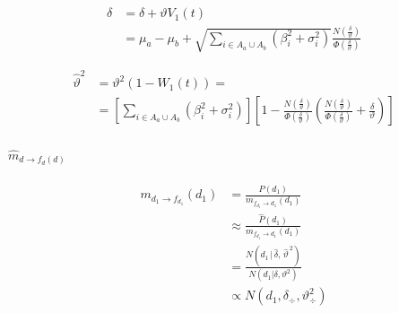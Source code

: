 \documentclass[11pt,twoside, spanish]{report} %
\begin{document}
\begin{equation}
	\begin{split}
		\widehat{\delta} &= \delta+\vartheta V_1(t) \\
		& = \mu_{a}-\mu_{b}+\sqrt{\sum_{i\in A_{a}\cup A_{b}}(\beta_i^2+\sigma_i^2)}\frac{N(\frac{\delta}{\vartheta})}{\Phi(\frac{\delta}{\vartheta})}
	\end{split}
\end{equation}

\begin{equation}
	\begin{split}
		\widehat{\vartheta}^2 &= \vartheta^2(1-W_1(t)) = \\
		&=\left[\sum_{i\in A_{a}\cup A_{b}}(\beta_i^2+\sigma_i^2)\right]\left[1-\frac{N(\frac{\delta}{\vartheta})}{\Phi(\frac{\delta}{\vartheta})}\left(\frac{N(\frac{\delta}{\vartheta})}{\Phi(\frac{\delta}{\vartheta})}+ \frac{\delta}{\vartheta}\right)\right]
	\end{split}
\end{equation}

\paragraph{$\widehat{m}_{d \rightarrow f_{d}(d)}$}

\begin{equation}\label{eq:m^_d_fd}
	\begin{split}
		m_{d_1 \rightarrow f_{d_1}}(d_1) &= \frac{P(d_1)}{m_{f_{d_1} \rightarrow d_1}(d_1)} \\
		&\approx \frac{\widehat{P}(d_1)}{m_{f_{d_1} \rightarrow d_1}(d_1)} \\
		& =  \frac{N(d_1 \,  | \,\widehat{\delta} , \, \widehat{\vartheta}^{\,2} )}{N(d_1 | \delta, \vartheta^2)} \\
		&\propto N(d_1,\delta_{\div},\vartheta_{\div}^2 )
	\end{split}
\end{equation}
\end{document}
